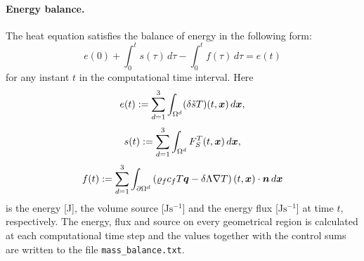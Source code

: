 \paragraph{Energy balance.}
The heat equation satisfies the balance of energy in the following form:
$$ e(0) + \int_0^t s(\tau) \,d\tau - \int_0^t f(\tau) \,d\tau = e(t) $$
for any instant $t$ in the computational time interval.
Here
$$ e(t) := \sum_{d=1}^3\int_{\Omega^d}(\delta \tilde s T)(t,\mathbf{\boldsymbol{x}})\,d\mathbf{\boldsymbol{x}}, $$
$$ s(t) := \sum_{d=1}^3\int_{\Omega^d}F_S^T(t,\mathbf{\boldsymbol{x}})\,d\mathbf{\boldsymbol{x}}, $$
$$ f(t) := \sum_{d=1}^3\int_{\partial\Omega^d}\left(\varrho_f c_f T\mathbf{\boldsymbol{q}} - \delta\Lambda\nabla T\right)(t,\mathbf{\boldsymbol{x}})\cdot\mathbf{\boldsymbol{n}} \,d\mathbf{\boldsymbol{x}} $$
is the energy [J], the volume source [J$\mathrm{s}^{-1}$] and the energy flux [J$\mathrm{s}^{-1}$] at time $t$, respectively.
The energy, flux and source on every geometrical region is calculated at each computational time step and the values together with the control sums are written to the file \texttt{mass\_balance.txt}.





